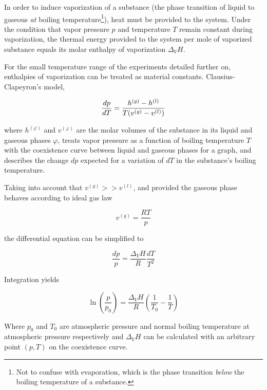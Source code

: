 
In order to induce vaporization of a substance (the phase transition of liquid to gaseous \textit{at} boiling temperature\footnote{Not to confuse with evaporation, which is the phase transition \textit{below} the boiling temperature of a substance.}), heat must be provided to the system. Under the condition that vapor pressure $p$ and temperature $T$ remain constant during vaporization, the thermal energy provided to the system per mole of vaporized substance equals its molar enthalpy of vaporization $\Delta_VH$.

For the small temperature range of the experiments detailed further on, enthalpies of vaporization can be treated as material constants. Clausius-Clapeyron's model,

\begin{equation} \label{eq:6.2} %
    \frac{dp}{dT} = \frac{h^{(g)} - h^{(l)}}{T \space (v^{(g)} - v^{(l)})}
\end{equation}

where $h^{(\varphi)}$ and $v^{(\varphi)}$  are the molar volumes of the substance in its liquid and gaseous phases $\varphi$, treats vapor pressure as a function of boiling temperature $T$ with the coexistence curve between liquid and gaseous phases for a graph, and describes the change $dp$ expected for a variation of $dT$ in the substance’s boiling temperature.

Taking into account that $v^{(g)} >> v^{(l)}$, and provided the gaseous phase behaves according to ideal gas law 

\begin{equation} \label{eq:6.5} %
    v^{(g)} = \frac{R T}{p}
\end{equation}

the differential equation can be simplified to

\begin{equation} \label{eq:6.6} %
    \frac{dp}{p} = \frac{\Delta_VH}{R} \frac{dT}{T^2}
\end{equation}

Integration yields

\begin{equation} \label{eq:6.7} %
    \ln \left( \frac{p}{p_0} \right) = \frac{\Delta_VH}{R} \left( \frac{1}{T_0} - \frac{1}{T} \right)
\end{equation}

Where $p_0$ and $T_0$ are atmospheric pressure and normal boiling temperature at atmospheric pressure respectively and $\Delta_VH$ can be calculated with an arbitrary point $(p, T)$ on the coexistence curve.


